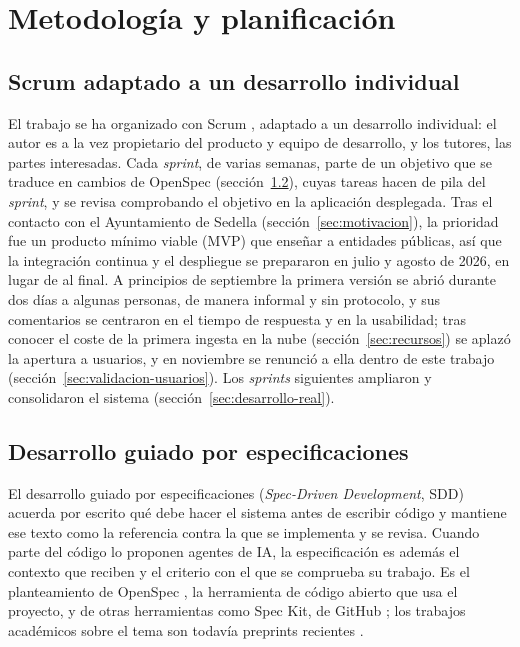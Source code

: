 \chapter{Metodología y planificación}
\label{cap:metodologia}

\section{Scrum adaptado a un desarrollo individual}
\label{sec:scrum}
\label{sec:iteraciones}

El trabajo se ha organizado con Scrum \cite{schwaber2020}, adaptado a un desarrollo individual: el autor es a la vez propietario del producto y equipo de desarrollo, y los tutores, las partes interesadas. Cada \emph{sprint}, de varias semanas, parte de un objetivo que se traduce en cambios de OpenSpec (sección~\ref{sec:sdd}), cuyas tareas hacen de pila del \emph{sprint}, y se revisa comprobando el objetivo en la aplicación desplegada. Tras el contacto con el Ayuntamiento de Sedella (sección~\ref{sec:motivacion}), la prioridad fue un producto mínimo viable (MVP) que enseñar a entidades públicas, así que la integración continua y el despliegue se prepararon en julio y agosto de 2026, en lugar de al final. A principios de septiembre la primera versión se abrió durante dos días a algunas personas, de manera informal y sin protocolo, y sus comentarios se centraron en el tiempo de respuesta y en la usabilidad; tras conocer el coste de la primera ingesta en la nube (sección~\ref{sec:recursos}) se aplazó la apertura a usuarios, y en noviembre se renunció a ella dentro de este trabajo (sección~\ref{sec:validacion-usuarios}). Los \emph{sprints} siguientes ampliaron y consolidaron el sistema (sección~\ref{sec:desarrollo-real}).

\section{Desarrollo guiado por especificaciones}
\label{sec:sdd}

El desarrollo guiado por especificaciones (\emph{Spec-Driven Development}, SDD) acuerda por escrito qué debe hacer el sistema antes de escribir código y mantiene ese texto como la referencia contra la que se implementa y se revisa. Cuando parte del código lo proponen agentes de IA, la especificación es además el contexto que reciben y el criterio con el que se comprueba su trabajo. Es el planteamiento de OpenSpec \cite{openspec}, la herramienta de código abierto que usa el proyecto, y de otras herramientas como Spec Kit, de GitHub \cite{delimarsky2025speckit}; los trabajos académicos sobre el tema son todavía preprints recientes \cite{piskala2026sdd}.

